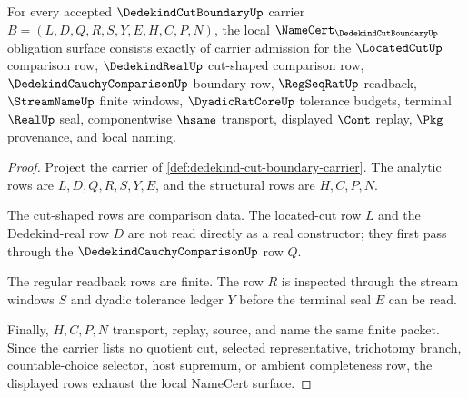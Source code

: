 \begin{theorem}
\label{thm:dedekind-cut-boundary-namecert-obligations}
For every accepted $\DedekindCutBoundaryUp$ carrier $B=(L,D,Q,R,S,Y,E,H,C,P,N)$, the local $\NameCert_{\DedekindCutBoundaryUp}$ obligation surface consists exactly of carrier admission for the $\LocatedCutUp$ comparison row, $\DedekindRealUp$ cut-shaped comparison row, $\DedekindCauchyComparisonUp$ boundary row, $\RegSeqRatUp$ readback, $\StreamNameUp$ finite windows, $\DyadicRatCoreUp$ tolerance budgets, terminal $\RealUp$ seal, componentwise $\hsame$ transport, displayed $\Cont$ replay, $\Pkg$ provenance, and local naming.
\end{theorem}
\begin{proof}
Project the carrier of \autoref{def:dedekind-cut-boundary-carrier}. The analytic rows are $L,D,Q,R,S,Y,E$, and the structural rows are $H,C,P,N$.

The cut-shaped rows are comparison data. The located-cut row $L$ and the Dedekind-real row $D$ are not read directly as a real constructor; they first pass through the $\DedekindCauchyComparisonUp$ row $Q$.

The regular readback rows are finite. The row $R$ is inspected through the stream windows $S$ and dyadic tolerance ledger $Y$ before the terminal seal $E$ can be read.

Finally, $H,C,P,N$ transport, replay, source, and name the same finite packet. Since the carrier lists no quotient cut, selected representative, trichotomy branch, countable-choice selector, host supremum, or ambient completeness row, the displayed rows exhaust the local NameCert surface.
\end{proof}

